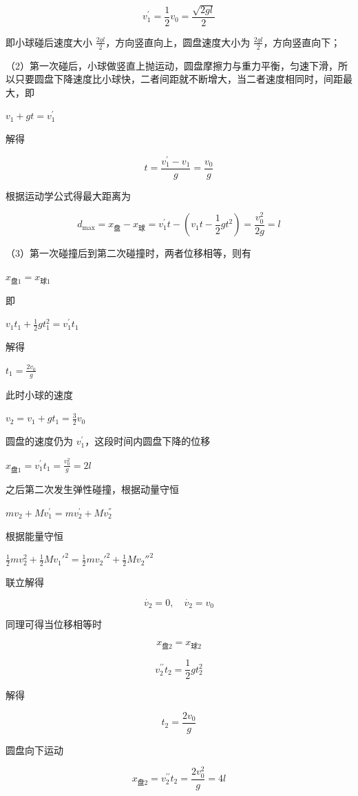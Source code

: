 \documentclass[\gkver]{gaokaozhenti}
\begin{document}
\begin{enumerate}
{$$ v_{1}^{\prime}=\frac{1}{2}v_{0}=\frac{\sqrt{2gl}}{2} $$

即小球碰后速度大小  $\frac{2gl}{2}$，方向竖直向上，圆盘速度大小为  $\frac{2gl}{2}$，方向竖直向下；

（2）第一次碰后，小球做竖直上抛运动，圆盘摩擦力与重力平衡，匀速下滑，所以只要圆盘下降速度比小球快，二者间距就不断增大，当二者速度相同时，间距最大，即

 $v_{1} + gt = v_{1}^{'}$

解得

$$ t=\frac{v_{1}^{\prime}-v_{1}}{g}=\frac{v_{0}}{g} $$

根据运动学公式得最大距离为

$$ d_{\max}=x_{ \text{盘} }-x_{ \text{球} }=v_{1}^{\prime}t-\left(v_{1}t-\frac{1}{2}gt^{2}\right)=\frac{v_{0}^{2}}{2g}=l $$

（3）第一次碰撞后到第二次碰撞时，两者位移相等，则有

 $x_{\text{盘}1}=x_{\text{球}1}$

即

 $v_{1}t_{1}+\frac{1}{2}gt_{1}^{2}=v_{1}^{'}t_{1}$

解得

 $t_{1}=\frac{2v_{0}}{g}$

此时小球的速度

 $v_{2}=v_{1}+gt_{1}=\frac{3}{2}v_{0}$

圆盘的速度仍为  $v_{1}^{'}$，这段时间内圆盘下降的位移

 $x_{\text{盘}1}=v_{1}^{'}t_{1}=\frac{v_{0}^{2}}{g}=2l$

之后第二次发生弹性碰撞，根据动量守恒

 $mv_{2}+Mv_{1}^{'}=mv_{2}^{'}+Mv_{2}^{''}$

根据能量守恒

 $\frac{1}{2}mv_{2}^{2}+\frac{1}{2}Mv_{1}'^{2}=\frac{1}{2}mv_{2}'^{2}+\frac{1}{2}Mv_{2}''^{2}$

联立解得

$$ \dot{v_{2}}=0,\quad\dot{v_{2}}=v_{0} $$

同理可得当位移相等时

$$ x_{ \text{盘} 2}=x_{ \text{球} 2} $$

$$ v_{2}^{\prime \prime}t_{2}=\frac{1}{2}gt_{2}^{2} $$

解得

$$ t_{2}=\frac{2v_{0}}{g} $$

圆盘向下运动

$$ x_{ \text{盘} 2}=v_{2}^{\prime \prime}t_{2}=\frac{2v_{0}^{2}}{g}=4l $$

}
\end{enumerate}
\end{document}
